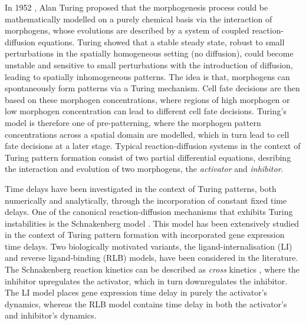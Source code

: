 In 1952 \cite{turing}, Alan Turing proposed that the morphogenesis process could be mathematically modelled on a purely chemical basis via the interaction of morphogens, whose evolutions are described by a system of coupled reaction-diffusion equations. Turing showed that a stable steady state, robust to small perturbations in the spatially homogeneous setting (no diffusion), could become unstable and sensitive to small perturbations with the introduction of diffusion, leading to spatially inhomogeneous patterns. The idea is that, morphogens can spontaneously form patterns via a Turing mechanism. Cell fate decisions are then based on these morphogen concentrations, where regions of high morphogen or low morphogen concentration can lead to different cell fate decisions. Turing's model is therefore one of pre-patterning, where the morphogen pattern concentrations across a spatial domain are modelled, which in turn lead to cell fate decisions at a later stage. Typical reaction-diffusion systems in the context of Turing pattern formation consist of two partial differential equations, desribing the interaction and evolution of two morphogens, the \textit{activator} and \textit{inhibitor}.

Time delays have been investigated in the context of Turing patterns, both numerically and analytically, through the incorporation of constant fixed time delays. One of the canonical reaction-diffusion mechanisms that exhibits Turing instabilities is the Schnakenberg model \cite{schnakenberg}. This model has been extensively studied in the context of Turing pattern formation with incorporated gene expression time delays. Two biologically motivated variants, the ligand-internalisation (LI) and reverse ligand-binding (RLB) models, have been considered in the literature. The Schnakenberg reaction kinetics can be described as \textit{cross} kinetics \cite{leegaffney}, where the inhibitor upregulates the activator, which in turn downregulates the inhibitor. The LI model places gene expression time delay in purely the activator's dynamics, whereas the RLB model contains time delay in both the activator's and inhibitor's dynamics.

